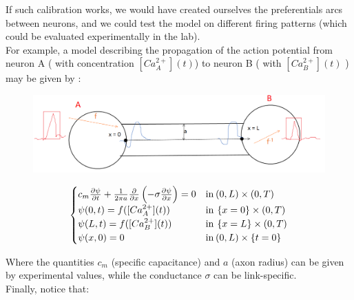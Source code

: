 \documentclass[a4paper]{article}
\begin{document}
If such calibration works, we would have created ourselves the preferentials arcs between neurons, and we could test the model on different firing patterns (which could be evaluated experimentally in the lab).\\
For example, a model describing the propagation of the action potential from neuron A ( with concentration $[Ca_A^{2+}](t)$) to neuron B ( with $[Ca_B^{2+}](t)$ ) may be given by : 

\begin{figure}[H]
	
	\begin{center}
		\includegraphics[scale=.55]{cable.png} 
	\end{center} 
		
\end{figure}
				
			\begin{Large}
				$$\begin{cases} 
				c_m \frac{\partial \psi}{\partial t} + \frac{1}{2 \pi a} \frac{\partial}{\partial x}\left(-\sigma \frac{\partial \psi}{\partial x} \right) = 0 & \text{in} \hspace{0.07 cm} (0,L) \times (0,T) \\
				\psi(0,t) = f([Ca_A^{2+}](t)) & \text{in} \hspace{0.07 cm} \left\{ x = 0\right\} \times (0,T) \\
				\psi(L,t) = f([Ca_B^{2+}](t)) & \text{in} \hspace{0.07 cm} \left\{ x = L\right\} \times (0,T) \\
				\psi(x,0)=0  & \text{in} \hspace{0.07 cm}  (0,L) \times \left\{ t = 0\right\}
				\end{cases}$$
			\end{Large}	
				
				
	Where the quantities $c_m$ (specific capacitance) and $a$ (axon radius) can be given by experimental values, while the conductance $\sigma$ can be link-specific.\\
	Finally, notice that:
	
\end{document}

